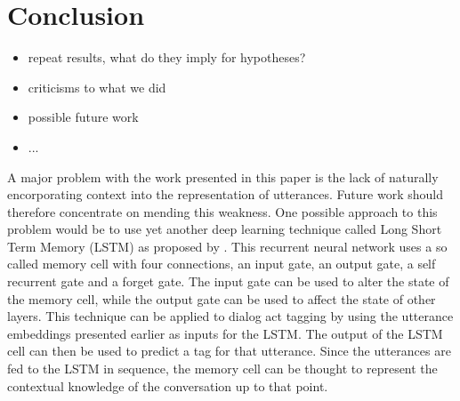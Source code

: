 \section{Conclusion}\label{sec:conclusion}
\begin{itemize}
	\item repeat results, what do they imply for hypotheses?
	\item criticisms to what we did
	\item possible future work
	\item ...
\end{itemize}



A major problem with the work presented in this paper is the lack of naturally encorporating context into the representation of utterances. Future work should therefore concentrate on mending this weakness. One possible approach to this problem would be to use yet another deep learning technique called Long Short Term Memory (LSTM) as proposed by . This recurrent neural network uses a so called memory cell with four connections, an input gate, an output gate, a self recurrent gate and a forget gate. The input gate can be used to alter the state of the memory cell, while the output gate can be used to affect the state of other layers. This technique can be applied to dialog act tagging by using the utterance embeddings presented earlier as inputs for the LSTM. The output of the LSTM cell can then be used to predict a tag for that utterance. Since the utterances are fed to the LSTM in sequence, the memory cell can be thought to represent the contextual knowledge of the conversation up to that point.